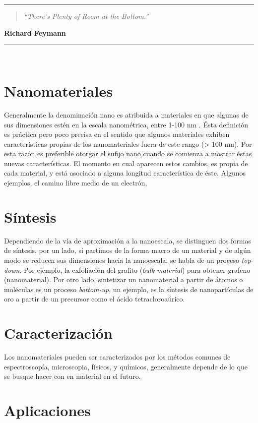 \noindent
\rule{\linewidth}{1 pt}
\begin{flushright}
	\begin{quotation}
		\small{
			\textit{``There’s Plenty of Room at the Bottom.''}}
	\end{quotation}
	\bf{Richard Feymann}
\end{flushright}
\noindent
\rule{\linewidth}{1 pt}\\
\vfill
\section{Nanomateriales}
Generalmente la denominación nano es atribuida a materiales en que algunas de sus dimensiones estén en la escala nanométrica, entre 1-100 nm \cite{Gressler2013}. Ésta definición es práctica pero poco precisa en el sentido que algunos materiales exhiben características propias de los nanomateriales fuera de este rango (> 100 nm). Por esta razón es preferible otorgar el sufijo nano cuando se comienza a mostrar éstas nuevas características. El momento en cual aparecen estos cambios, es propia de cada material, y está asociado a alguna longitud característica de éste. Algunos ejemplos, el camino libre medio de un electrón, 

\section{Síntesis}
Dependiendo de la vía de aproximación a la nanoescala, se distinguen dos formas de síntesis, por un lado, si partimos de la forma macro de un material y de algún modo se reducen sus dimensiones hacia la nanoescala, se habla de un proceso \textit{top-down}. Por ejemplo, la exfoliación del grafito (\textit{bulk material}) para obtener grafeno (nanomaterial).  Por otro lado, sintetizar un nanomaterial a partir de átomos o moléculas es un proceso \textit{bottom-up}, un ejemplo, es la síntesis de nanopartículas de oro a partir de un precursor como el ácido tetracloroaúrico.

\section{Caracterización}
Los nanomateriales pueden ser caracterizados por los métodos comunes de espectroscopía, microscopia, físicos, y químicos, generalmente depende de lo que se busque hacer con en material en el futuro.

\section{Aplicaciones}

